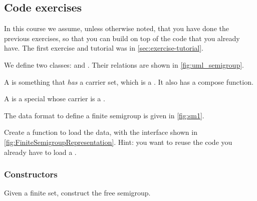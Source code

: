 \subsection{Code exercises}

\begin{remark}
  In this course we assume, unless otherwise noted, that you have done the previous exercises, so that you can build on top of the code that you already have. The first exercise and tutorial was in \cref{sec:exercise-tutorial}.
\end{remark}

\begin{marginfigure}\label{fig:uml_semigroup}
\end{marginfigure}

We define two classes: \Semigroup and \FiniteSemigroup.
Their relations are shown in \cref{fig:uml_semigroup}.

A \Semigroup is something that \emph{has} a carrier set, which is a \Setoid.
It also has a compose function.


A \FiniteSemigroup is a special \Semigroup whose carrier is a \FiniteSet.



The data format to define a finite semigroup is given in \cref{fig:sm1}.


\begin{gradedexercise}
  \label{ex:TestFiniteSemigroupRepresentation}
  Create a function to load the data, with the interface shown in \cref{fig:FiniteSemigroupRepresentation}.
  Hint: you want to reuse the code you already have to load a \FiniteSet.
\end{gradedexercise}


\begin{figure*}\label{fig:FiniteSemigroupRepresentation}
\end{figure*}

\subsubsection*{Constructors}

\begin{gradedexercise}
  \label{ex:FiniteSemigroupRepresentation}
  Given a finite set, construct the free semigroup.

\end{gradedexercise}
